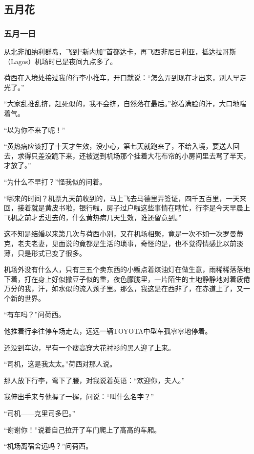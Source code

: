 \subsection{五月花}

\subsubsection{五月一日}
\par 从北非加纳利群岛，飞到“新内加”首都达卡，再飞西非尼日利亚，抵达拉哥斯（Lagos）机场时已是夜间九点多了。
\par 荷西在入境处接过我的行李小推车，开口就说：“怎么弄到现在才出来，别人早走光了。”
\par “大家乱推乱挤，赶死似的，我不会挤，自然落在最后。”擦着满脸的汗，大口地喘着气。
\par “以为你不来了呢！”
\par “黄热病应该打了十天才生效，没小心，第七天就跑来了，不给入境，要送人回去，求得只差没跪下来，还被送到机场那个挂着大花布帘的小房间里去骂了半天，才放了。”
\par “为什么不早打？”怪我似的问着。
\par “哪来的时间？机票九天前收到的，马上飞去马德里弄签证，四千五百里，一天来回，接着就是黄皮书啦，银行啦，房子过户啦这些事情在瞎忙，行李是今天早晨上飞机之前才丢进去的，什么黄热病几天生效，谁还留意到。”
\par 这不知是结婚以来第几次与荷西小别，又在机场相聚，竟是一次不如一次罗曼蒂克，老夫老妻，见面说的竟都是生活的琐事，奇怪的是，也不觉得情感比以前淡薄，只是形式已变了很多。
\par 机场外没有什么人，只有三五个卖东西的小贩点着煤油灯在做生意，雨稀稀落落地下着，打在身上好似撒豆子似的重，夜色朦胧里，一片陌生的土地静静地对着疲倦万分的我，汗，如水似的流入颈子里。那么，我这是在西非了，在赤道上了，又一个新的世界。
\par “有车吗？”问荷西。
\par 他推着行李往停车场走去，远远一辆TOYOTA中型车孤零零地停着。
\par 还没到车边，早有一个瘦高穿大花衬衫的黑人迎了上来。
\par “司机，这是我太太。”荷西对那人说。
\par 那人放下行李，弯下了腰，对我说着英语：“欢迎你，夫人。”
\par 我伸出手来与他握了一握，问说：“叫什么名字？”
\par “司机——克里司多巴。”
\par “谢谢你！”说着自己拉开了车门爬上了高高的车厢。
\par “机场离宿舍远吗？”问荷西。
